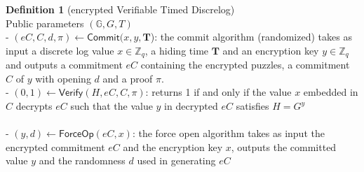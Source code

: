 \documentclass{article}      	%
\begin{document}
\textbf{Definition 1} (encrypted Verifiable Timed Discrelog) \\
Public parameters $(\mathbb{G}, G, T)$ \\
- $(eC, C, d, \pi) \gets \mathsf{Commit}(x, y, \textbf{T}$): the commit algorithm (randomized) takes as input a discrete log value $x \in \mathbb{Z}_q$, a hiding time $\textbf{T}$ and an encryption key $ y \in \mathbb{Z}_q$ and outputs a commitment $eC$ containing the encrypted puzzles, a commitment $C$ of $y$ with opening $d$ and a proof $\pi$. \\
- $(0,1) \gets \mathsf{Verify}(H, eC, C, \pi)$: returns 1 if and only if the value $x$ embedded in $C$ decrypts $eC$ such that the value $y$ in decrypted $eC$ satisfies $H = G^y$  \\ \\
- $(y, d) \gets \mathsf{ForceOp}(eC, x)$: the force open algorithm takes as input the encrypted commitment $eC$ and the encryption key $x$, outputs the committed value $y$ and the randomness $d$ used in generating $eC$
\end{document}
